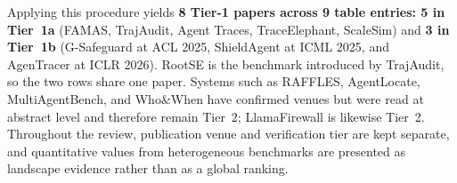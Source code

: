 Applying this procedure yields \textbf{8 Tier-1 papers across 9 table entries: 5 in Tier~1a} (FAMAS, TrajAudit, Agent Traces, TraceElephant, ScaleSim) and \textbf{3 in Tier~1b} (G-Safeguard at ACL 2025, ShieldAgent at ICML 2025, and AgenTracer at ICLR 2026). RootSE is the benchmark introduced by TrajAudit, so the two rows share one paper. Systems such as RAFFLES, AgentLocate, MultiAgentBench, and Who\&When have confirmed venues but were read at abstract level and therefore remain Tier~2; LlamaFirewall is likewise Tier~2. Throughout the review, publication venue and verification tier are kept separate, and quantitative values from heterogeneous benchmarks are presented as landscape evidence rather than as a global ranking.
